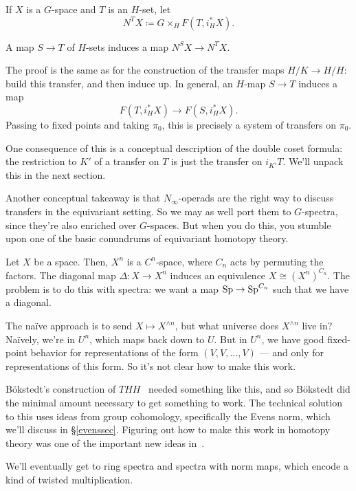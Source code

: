 If $X$ is a $G$-space and $T$ is an $H$-set, let
\[N^TX\coloneqq G\times_H F(T, i_H^*X).\]
\begin{lem}
A map $S\to T$ of $H$-sets induces a map $N^S X\to N^T X$.
\end{lem}
The proof is the same as for the construction of the transfer maps $H/K\to H/H$: build this transfer, and then
induce up. In general, an $H$-map $S\to T$ induces a map
\[F(T, i_H^*X)\longrightarrow F(S, i_H^*X).\]
Passing to fixed points and taking $\pi_0$, this is precisely a system of transfers on $\pi_0$.
\begin{rem}
One consequence of this is a conceptual description of the double coset formula: the restriction to $K'$ of a
transfer on $T$ is just the transfer on $i_{K'}T$. We'll unpack this in the next section.
\end{rem}
Another conceptual takeaway is that $N_\infty$-operads are the right way to discuss transfers in the equivariant
setting. So we may as well port them to $G$-spectra, since they're also enriched over $G$-spaces. But when you do
this, you stumble upon one of the basic conundrums of equivariant homotopy theory.

Let $X$ be a space. Then, $X^n$ is a $C^n$-space, where $C_n$ acts by permuting the factors. The diagonal map
$\Delta\colon X\to X^n$ induces an equivalence $X\cong (X^n)^{C_n}$. The problem is to do this with spectra: we
want a map $\mathrm{Sp}\to\mathrm{Sp}^{C_n}$ such that we have a diagonal.

The naïve approach is to send $X\mapsto X^{\wedge n}$, but what universe does $X^{\wedge n}$ live in? Naïvely,
we're in $U^n$, which maps back down to $U$. But in $U^n$, we have good fixed-point behavior for representations of
the form $(V,V,\dotsc,V)$ --- and only for representations of this form. So it's not clear how to make this work.

Bökstedt's construction of $\mathit{THH}$~\cite{Bokstedt} needed something like this, and so Bökstedt did the
minimal amount necessary to get something to work. The technical solution to this uses ideas from group cohomology,
specifically the Evens norm, which we'll discuss in \S\ref{evenssec}. Figuring out how to make this work in
homotopy theory was one of the important new ideas in~\cite{HHR}.

We'll eventually get to ring spectra and spectra with norm maps, which encode a kind of twisted multiplication.


